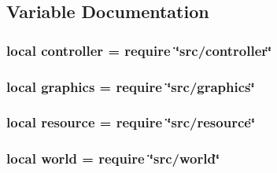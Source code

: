\subsection{Variable Documentation}
\hypertarget{main_8lua_a42ca47a193e6b84d402c2a9fab0a69f1}{
\subsubsection[{controller}]{\setlength{\rightskip}{0pt plus 5cm}local controller = require \char`\"{}src/controller\char`\"{}}}\label{main_8lua_a42ca47a193e6b84d402c2a9fab0a69f1}
\hypertarget{main_8lua_aae06ace8bee01f93d02dfaa4436de916}{
\subsubsection[{graphics}]{\setlength{\rightskip}{0pt plus 5cm}local graphics = require \char`\"{}src/graphics\char`\"{}}}\label{main_8lua_aae06ace8bee01f93d02dfaa4436de916}
\hypertarget{main_8lua_a24ad487107aaa56bef35825abbe9773d}{
\subsubsection[{resource}]{\setlength{\rightskip}{0pt plus 5cm}local resource = require \char`\"{}src/resource\char`\"{}}}\label{main_8lua_a24ad487107aaa56bef35825abbe9773d}
\hypertarget{main_8lua_a054520f514ab0d9a9b0fede5a23db9f7}{
\subsubsection[{world}]{\setlength{\rightskip}{0pt plus 5cm}local world = require \char`\"{}src/world\char`\"{}}}\label{main_8lua_a054520f514ab0d9a9b0fede5a23db9f7}
